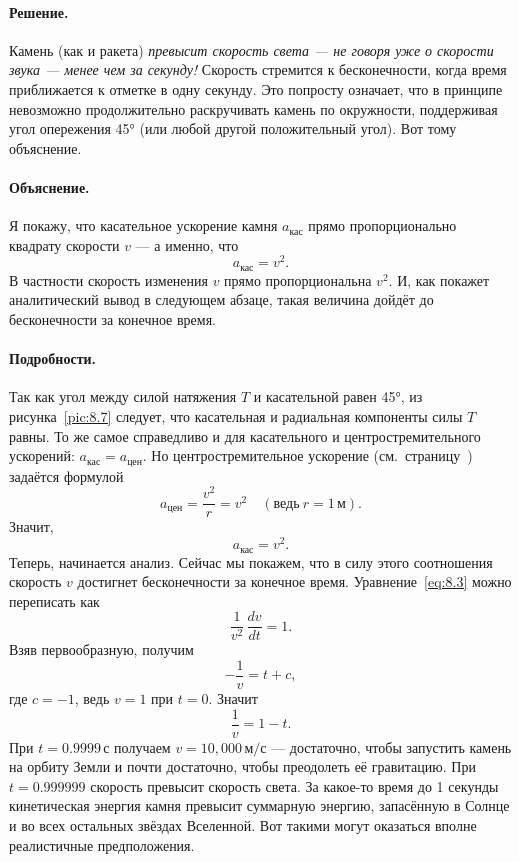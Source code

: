 \paragraph{Решение.}
Камень (как и ракета) \emph{превысит скорость света --- не говоря уже о скорости звука --- менее чем за секунду!}
Скорость стремится к бесконечности, когда время приближается к отметке в одну секунду.
Это попросту означает, что в принципе невозможно продолжительно раскручивать камень по окружности, поддерживая угол опережения 45° (или любой другой положительный угол).
Вот тому объяснение.

\paragraph{Объяснение.}
Я покажу, что касательное ускорение камня $a_{\text{кас}}$ прямо пропорционально квадрату скорости $v$ ---
а именно, что
\[
a_{\text{кас}}=v^{2}.
\]
В частности скорость изменения $v$ прямо пропорциональна $v^2$.
И, как покажет аналитический вывод в следующем абзаце, такая величина дойдёт до бесконечности за конечное время.

\paragraph{Подробности.}
Так как угол между силой натяжения $T$ и касательной равен 45°,
из рисунка~\ref{pic:8.7} следует, что касательная и радиальная компоненты силы $T$ равны.
То же самое справедливо и для касательного и центростремительного ускорений:
$a_{\text{кас}}=a_{\text{цен}}$.
Но центростремительное ускорение (см.~страницу~\pageref{sec:A.9}) задаётся формулой
\[
a_{\text{цен}}=\frac{v^2}{r}=v^2 \quad (\text{ведь}\  r=1\,\text{м}).
\]
Значит,
\begin{equation}
a_{\text{кас}}=v^2. \label{eq:8.3}
\end{equation}
Теперь, начинается анализ.
Сейчас мы покажем, что в силу этого соотношения
скорость $v$ достигнет бесконечности за конечное время.
Уравнение~\eqref{eq:8.3} можно переписать как
\begin{equation}
\frac{1}{v^2}\,\frac{dv}{dt}=1. \label{eq:8.4}
\end{equation}
Взяв первообразную, получим
\[
-\frac{1}{v}=t + c,
\]
где $c=-1$, ведь $v=1$ при $t=0$.
Значит
\[
\frac{1}{v}=1 - t.
\]
При $t=0.9999 \,\text{с}$ получаем $v=10{,}000 \,\text{м/с}$ ---
достаточно, чтобы запустить камень на орбиту Земли и почти достаточно,
чтобы преодолеть её гравитацию.
При $t=0.999999$ скорость превысит скорость света.
За какое-то время до 1 секунды кинетическая энергия камня
превысит суммарную энергию, запасённую в Солнце и во всех остальных
звёздах Вселенной.
Вот такими могут оказаться вполне реалистичные предположения.

